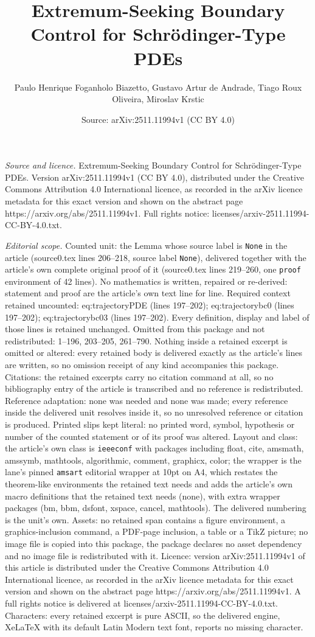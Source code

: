 \documentclass[10pt,a4paper]{amsart}
\title[Extremum-Seeking Boundary Control for Schr\"odinger-Type PDE]{Extremum-Seeking Boundary Control for Schr\"odinger-Type PDEs}
\author{Paulo Henrique Foganholo Biazetto, Gustavo Artur de Andrade, Tiago Roux Oliveira, Miroslav Krstic}
\date{Source: arXiv:2511.11994v1 (CC BY 4.0)}
\begin{document}
\maketitle

\noindent\emph{Source and licence.} Extremum-Seeking Boundary Control for Schr\"odinger-Type PDEs. Version arXiv:2511.11994v1 (CC BY 4.0), distributed under the Creative Commons Attribution 4.0 International licence, as recorded in the arXiv licence metadata for this exact version and shown on the abstract page https://arxiv.org/abs/2511.11994v1. Full rights notice: licenses/arxiv-2511.11994-CC-BY-4.0.txt.\par\smallskip

\noindent\textit{Editorial scope.} Counted unit: the Lemma whose source label is \texttt{None} in the article (source0.tex lines 206--218, source label \texttt{None}), delivered together with the article's own complete original proof of it (source0.tex lines 219--260, one \texttt{proof} environment of 42 lines). No mathematics is written, repaired or re-derived: statement and proof are the article's own text line for line. Required context retained uncounted: eq:trajectoryPDE (lines 197--202); eq:trajectorybc0 (lines 197--202); eq:trajectorybc03 (lines 197--202). Every definition, display and label of those lines is retained unchanged. Omitted from this package and not redistributed: 1--196, 203--205, 261--790. Nothing inside a retained excerpt is omitted or altered: every retained body is delivered exactly as the article's lines are written, so no omission receipt of any kind accompanies this package. Citations: the retained excerpts carry no citation command at all, so no bibliography entry of the article is transcribed and no reference is redistributed. Reference adaptation: none was needed and none was made; every reference inside the delivered unit resolves inside it, so no unresolved reference or citation is produced. Printed slips kept literal: no printed word, symbol, hypothesis or number of the counted statement or of its proof was altered. Layout and class: the article's own class is \texttt{ieeeconf} with packages including float, cite, amsmath, amssymb, mathtools, algorithmic, comment, graphicx, color; the wrapper is the lane's pinned \texttt{amsart} editorial wrapper at 10pt on A4, which restates the theorem-like environments the retained text needs and adds the article's own macro definitions that the retained text needs (none), with extra wrapper packages (bm, bbm, dsfont, xspace, cancel, mathtools). The delivered numbering is the unit's own. Assets: no retained span contains a figure environment, a graphics-inclusion command, a PDF-page inclusion, a table or a TikZ picture; no image file is copied into this package, the package declares no asset dependency and no image file is redistributed with it. Licence: version arXiv:2511.11994v1 of this article is distributed under the Creative Commons Attribution 4.0 International licence, as recorded in the arXiv licence metadata for this exact version and shown on the abstract page https://arxiv.org/abs/2511.11994v1. A full rights notice is delivered at licenses/arxiv-2511.11994-CC-BY-4.0.txt. Characters: every retained excerpt is pure ASCII, so the delivered engine, XeLaTeX with its default Latin Modern text font, reports no missing character.
\end{document}
